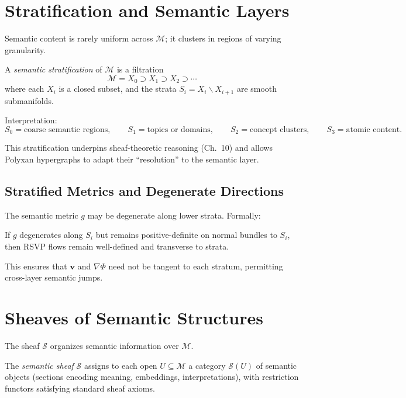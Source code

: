 \section{Stratification and Semantic Layers}

Semantic content is rarely uniform across $\mathcal{M}$; it clusters in
regions of varying granularity.

\begin{definition}
A \emph{semantic stratification} of $\mathcal{M}$ is a filtration
\[
\mathcal{M} = X_0 \supset X_1 \supset X_2 \supset \cdots
\]
where each $X_i$ is a closed subset, and the strata
$S_i = X_i \smallsetminus X_{i+1}$
are smooth submanifolds.
\end{definition}

Interpretation:
\[
S_0 = \text{coarse semantic regions}, \qquad
S_1 = \text{topics or domains}, \qquad
S_2 = \text{concept clusters}, \qquad
S_3 = \text{atomic content}.
\]

This stratification underpins sheaf-theoretic reasoning (Ch.~10) and allows
Polyxan hypergraphs to adapt their ``resolution'' to the semantic layer.

\subsection{Stratified Metrics and Degenerate Directions}

The semantic metric $g$ may be degenerate along lower strata. Formally:

\begin{proposition}
If $g$ degenerates along $S_i$ but remains positive-definite on normal bundles
to $S_i$, then RSVP flows remain well-defined and transverse to strata.
\end{proposition}

This ensures that $\mathbf{v}$ and $\nabla \Phi$ need not be tangent to each
stratum, permitting cross-layer semantic jumps.

\section{Sheaves of Semantic Structures}

The sheaf $\mathscr{S}$ organizes semantic information over $\mathcal{M}$.

\begin{definition}
The \emph{semantic sheaf} $\mathscr{S}$ assigns to each open
$U \subseteq \mathcal{M}$ a category $\mathscr{S}(U)$ of semantic objects
(sections encoding meaning, embeddings, interpretations), with restriction
functors satisfying standard sheaf axioms.
\end{definition}

